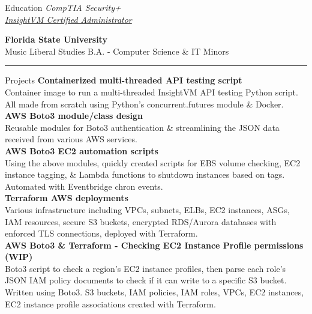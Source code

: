 \documentclass{resume} %
\begin{document}
{\begin{rSection}{Education}
{			{\em CompTIA Security+}}\\ %
		{\color{cyan}
			\href{https://verify.skilljar.com/c/sxetfkgywaqn}
			{\em InsightVM Certified Administrator}}%
		\begin{center}
			{\bf Florida State University}\\ %
			Music Liberal Studies B.A. - Computer Science \& IT Minors\end{center}
		\vspace{-0.2cm}\rule{\textwidth}{0.5pt}
	\end{rSection}

	\begin{rSection}{Projects}
		{\bf Containerized multi-threaded API testing script}\\
		Container image to run a multi-threaded InsightVM API testing Python script. All made from scratch using Python's concurrent.futures module \& Docker.\\
		
		{\bf AWS Boto3 module/class design}\\
		Reusable modules for Boto3 authentication \& streamlining the JSON data received from various AWS services.\\
		
		{\bf AWS Boto3 EC2 automation scripts}\\
		Using the above modules, quickly created scripts for EBS volume checking, EC2 instance tagging, \& Lambda functions to shutdown instances based on tags. Automated with Eventbridge chron events.\\
		
		{\bf Terraform AWS deployments}\\
		Various infrastructure including VPCs, subnets, ELBs, EC2 instances, ASGs, IAM resources, secure S3 buckets, encrypted RDS/Aurora databases with enforced TLS connections, deployed with Terraform.\\
		
		{\bf AWS Boto3 \& Terraform - Checking EC2 Instance Profile permissions (WIP)}\\
		Boto3 script to check a region's EC2 instance profiles, then parse each role's JSON IAM policy documents to check if it can write to a specific S3 bucket. Written using Boto3.
		S3 buckets, IAM policies, IAM roles, VPCs, EC2 instances, EC2 instance profile associations created with Terraform.\\
		

\end{rSection}}
\end{document}
